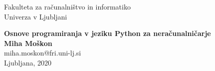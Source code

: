 \clearpage
\begin{center}
{\small Fakulteta za računalništvo in informatiko \\
 Univerza v Ljubljani\\}
\vspace{5cm}

 {\huge\bfseries\sffamily\color{chapter_col} Osnove programiranja v jeziku Python za neračunalničarje\\}
 \vspace{3cm}
 {\large\bfseries Miha Moškon}\\[5pt]
 miha.moskon@fri.uni-lj.si\\[14pt]
  \vspace{2cm}
 \vfill
{Ljubljana, 2020}
\end{center}
\thispagestyle{empty}
